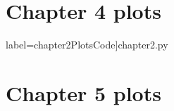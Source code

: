 \chapter{Chapter 4 plots}\label{app:chapter4}


label=chapter2PlotsCode]{chapter2.py}
\chapter{Chapter 5 plots}\label{app:chapter5}

\fi
